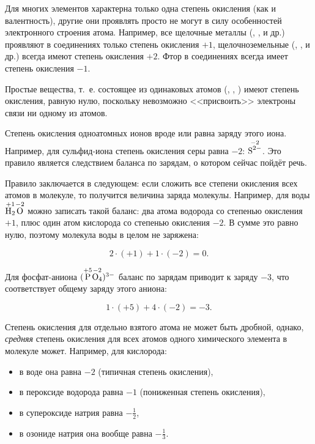 Для многих элементов характерна только одна степень окисления (как и валентность), другие они проявлять просто не могут в силу особенностей электронного строения атома. Например, все щелочные металлы (, ,  и др.) проявляют в соединениях только степень окисления $+1$, щелочноземельные (, ,  и др.) всегда имеют степень окисления $+2$. Фтор в соединениях всегда имеет степень окисления $-1$.

Простые вещества, т.~е. состоящее из одинаковых атомов (, , ) имеют степень окисления, равную нулю, поскольку невозможно <<присвоить>> электроны связи ни одному из атомов.

Степень окисления одноатомных ионов вроде  или  равна заряду этого иона. Например, для сульфид-иона степень окисления серы равна $-2$: $\overset{-2}{\ce{S^{2-}}}$. Это правило является следствием баланса по зарядам, о котором сейчас пойдёт речь.

Правило  заключается в следующем: если сложить все степени окисления всех атомов в молекуле, то получится величина заряда молекулы. Например, для воды $\overset{+1}{\ce{H2}}\overset{-2}{\ce{O}}$ можно записать такой баланс: два атома водорода со степенью окисления $+1$, плюс один атом кислорода со степенью окисления $-2$. В сумме это равно нулю, поэтому молекула воды в целом не заряжена:

\begin{equation*}
    2 \cdot (+1) + 1 \cdot (-2) = 0.
\end{equation*}

Для фосфат-аниона $(\overset{+5}{\ce{P}}\overset{-2}{\ce{O4}})^{3-}$ баланс по зарядам приводит к заряду $-3$, что соответствует общему заряду этого аниона:

\begin{equation*}
    1 \cdot (+5) + 4 \cdot (-2) = -3.
\end{equation*}

Степень окисления для отдельно взятого атома не может быть дробной, однако, \emph{средняя} степень окисления для всех атомов одного химического элемента в молекуле может. Например, для кислорода:

\begin{itemize}
    \item в воде она равна $-2$ (типичная степень окисления),
    \item в пероксиде водорода  равна $-1$ (пониженная степень окисления),
    \item в супероксиде натрия  равна $-\frac{1}{2}$,
    \item в озониде натрия  она вообще равна $-\frac{1}{3}$.
\end{itemize}

